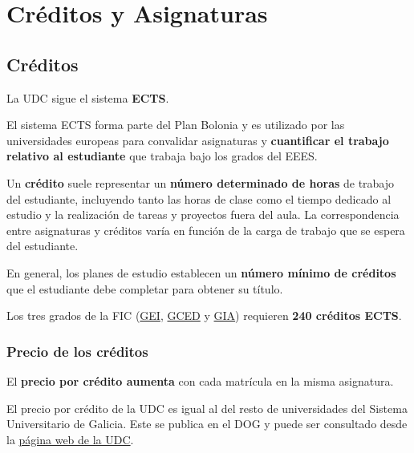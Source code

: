 \chapter{Créditos y Asignaturas}

\section{Créditos}

La \acrshort{UDC} sigue el sistema \textbf{\acrfull{ECTS}}.

\begin{curiosityBox}
    El sistema \acrshort{ECTS} forma parte del Plan Bolonia y es utilizado por las universidades europeas para convalidar asignaturas y \textbf{cuantificar el trabajo relativo al estudiante} que trabaja bajo los grados del \acrfull{EEES}.
\end{curiosityBox}

Un \textbf{crédito} suele representar un \textbf{número determinado de horas} de trabajo del estudiante, incluyendo tanto las horas de clase como el tiempo dedicado al estudio y la realización de tareas y proyectos fuera del aula. La correspondencia entre asignaturas y créditos varía en función de la carga de trabajo que se espera del estudiante.

En general, los planes de estudio establecen un \textbf{número mínimo de créditos} que el estudiante debe completar para obtener su título.

\begin{infoBox}
    Los tres grados de la \acrshort{FIC} (\href{\linkPortalGEI}{\acrshort{GEI}}, \href{\linkPortalGCED}{\acrshort{GCED}} y \href{\linkPortalGIA}{\acrshort{GIA}}) requieren \textbf{240 créditos ECTS}.
\end{infoBox}

\subsection{Precio de los créditos}

El \textbf{precio por crédito aumenta} con cada matrícula en la misma asignatura.

\begin{curiosityBox}
    El precio por crédito de la \acrshort{UDC} es igual al del resto de universidades del Sistema Universitario de Galicia. Este se publica en el \acrfull{DOG} y puede ser consultado desde la \href{https://www.udc.es/es/matricula/}{página web de la UDC}.
\end{curiosityBox}

